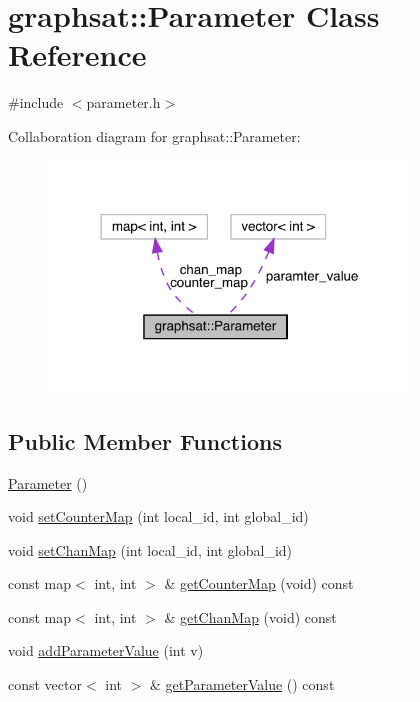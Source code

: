 \hypertarget{classgraphsat_1_1_parameter}{}\section{graphsat\+::Parameter Class Reference}
\label{classgraphsat_1_1_parameter}


{\ttfamily \#include $<$parameter.\+h$>$}



Collaboration diagram for graphsat\+::Parameter\+:
\nopagebreak
\begin{figure}[H]
\begin{center}
\leavevmode
\includegraphics[width=273pt]{classgraphsat_1_1_parameter__coll__graph}
\end{center}
\end{figure}
\subsection*{Public Member Functions}
\begin{DoxyCompactItemize}
\item 
\mbox{\hyperlink{classgraphsat_1_1_parameter_a89c4d6947e1ff44bfbb4e85406321c06}{Parameter}} ()
\item 
void \mbox{\hyperlink{classgraphsat_1_1_parameter_aeb19c4b110f01b846c9e20ae666ca02c}{set\+Counter\+Map}} (int local\+\_\+id, int global\+\_\+id)
\item 
void \mbox{\hyperlink{classgraphsat_1_1_parameter_a34bcbd7b010a26f7b7f4cf78652fe78d}{set\+Chan\+Map}} (int local\+\_\+id, int global\+\_\+id)
\item 
const map$<$ int, int $>$ \& \mbox{\hyperlink{classgraphsat_1_1_parameter_a452bc578f7adf8feaedd40f3aa06fab9}{get\+Counter\+Map}} (void) const
\item 
const map$<$ int, int $>$ \& \mbox{\hyperlink{classgraphsat_1_1_parameter_a3f4d846ef936f82d07b5a2e4e4b632ee}{get\+Chan\+Map}} (void) const
\item 
void \mbox{\hyperlink{classgraphsat_1_1_parameter_a9d1fc3675ee07f866afca38a9fd198ff}{add\+Parameter\+Value}} (int v)
\item 
const vector$<$ int $>$ \& \mbox{\hyperlink{classgraphsat_1_1_parameter_a9f6ef8090aefb3f53ca031b70a9c81c4}{get\+Parameter\+Value}} () const
\end{DoxyCompactItemize}
